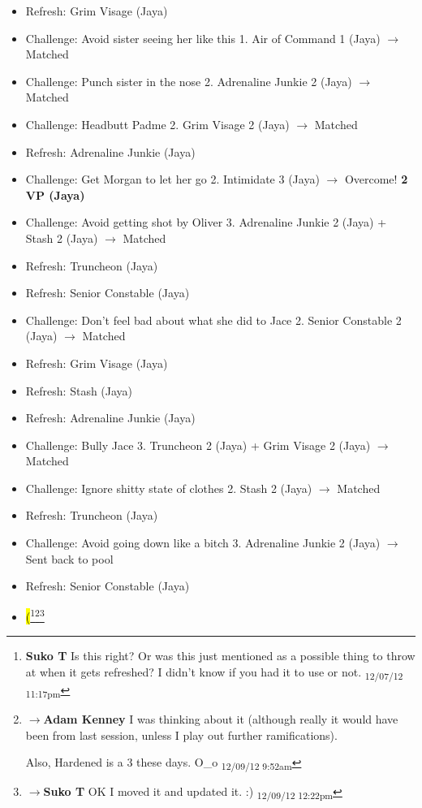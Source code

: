 {\begin{itemize}
\item Refresh: Grim Visage (Jaya)
\item Challenge: Avoid sister seeing her like this 1. Air of Command 1 (Jaya) $\rightarrow$ Matched
\item Challenge: Punch sister in the nose 2.  Adrenaline Junkie 2 (Jaya) $\rightarrow$ Matched
\item Challenge: Headbutt Padme 2. Grim Visage 2 (Jaya) $\rightarrow$ Matched
\item Refresh: Adrenaline Junkie (Jaya)
\item Challenge: Get Morgan to let her go 2.  Intimidate 3 (Jaya) $\rightarrow$ Overcome! \textbf{2 VP (Jaya)}
\item Challenge: Avoid getting shot by Oliver 3. Adrenaline Junkie 2 (Jaya) + Stash 2 (Jaya) $\rightarrow$ Matched
\item Refresh: Truncheon (Jaya)
\item Refresh: Senior Constable (Jaya)
\item Challenge: Don't feel bad about what she did to Jace 2.  Senior Constable 2 (Jaya) $\rightarrow$ Matched
\item Refresh: Grim Visage (Jaya)
\item Refresh: Stash (Jaya)
\item Refresh: Adrenaline Junkie (Jaya)
\item Challenge: Bully Jace 3.  Truncheon 2 (Jaya) + Grim Visage 2 (Jaya) $\rightarrow$ Matched
\item Challenge: Ignore shitty state of clothes 2.  Stash 2 (Jaya) $\rightarrow$ Matched
\item Refresh: Truncheon (Jaya)
\item Challenge: Avoid going down like a bitch 3. Adrenaline Junkie 2 (Jaya) $\rightarrow$ Sent back to pool
\item Refresh: Senior Constable (Jaya)
\end{itemize}

}


\begin{itemize}
\item \hl{(}\footnote{\textbf{Suko T }Is this right?  Or was this just mentioned as a possible thing to throw at when it gets refreshed?  I didn't know if you had it to use or not. \textsubscript{12/07/12 11:17pm}}\footnote{$\rightarrow$\textbf{Adam Kenney }I was thinking about it (although really it would have been from last session, unless I play out further ramifications).

Also, Hardened is a 3 these days. O\_o \textsubscript{12/09/12 9:52am}}\footnote{$\rightarrow$\textbf{Suko T }OK I moved it and updated it. :) \textsubscript{12/09/12 12:22pm}}
\end{itemize}



